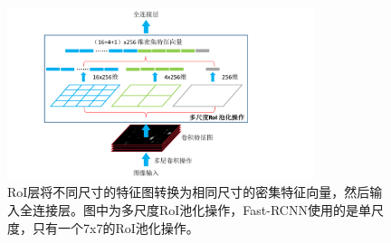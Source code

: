 \begin{figure}[t]
	\centering
	\includegraphics[trim={4cm, 0cm, 7cm, 0cm}, clip,width=0.8\textwidth]{./imgs/roi.pdf}
	\caption{RoI层将不同尺寸的特征图转换为相同尺寸的密集特征向量，然后输入全连接层。图中为多尺度RoI池化操作，Fast-RCNN使用的是单尺度，只有一个7x7的RoI池化操作。}
	\label{fig:roi}
\end{figure}
